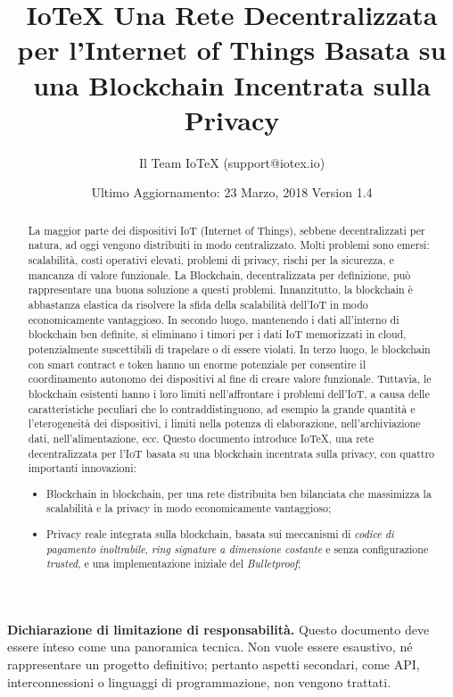 \documentclass[a4paper,12pt]{article}
\title{
	IoTeX
	\linebreak
	\Large Una Rete Decentralizzata per l'Internet of Things
	\linebreak
	\Large Basata su una Blockchain Incentrata sulla Privacy}
\author{Il Team IoTeX (support@iotex.io)}
\date{Ultimo Aggiornamento: 23 Marzo, 2018
	\linebreak Version 1.4
	}
\begin{document}
\maketitle

\vspace{200pt}


\textbf{Dichiarazione di limitazione di responsabilità.} Questo documento deve essere inteso come una panoramica tecnica. Non vuole essere esaustivo, né rappresentare un progetto definitivo; pertanto aspetti secondari, come API, interconnessioni o linguaggi di programmazione, non vengono trattati.

\pagebreak

\begin{abstract}
	La maggior parte dei dispositivi IoT (Internet of Things), sebbene decentralizzati per natura, ad oggi vengono distribuiti in modo centralizzato. Molti problemi sono emersi: scalabilità, costi operativi elevati, problemi di privacy, rischi per la sicurezza, e mancanza di valore funzionale. La Blockchain, decentralizzata per definizione, può rappresentare una buona soluzione a questi problemi. Innanzitutto, la blockchain è abbastanza elastica da risolvere la sfida della scalabilità dell'IoT in modo economicamente vantaggioso. In secondo luogo, mantenendo i dati all'interno di blockchain ben definite, si eliminano i timori per i dati IoT memorizzati in cloud, potenzialmente suscettibili di trapelare o di essere violati. In terzo luogo, le blockchain con smart contract e token hanno un enorme potenziale per consentire il coordinamento autonomo dei dispositivi al fine di creare valore funzionale. Tuttavia, le blockchain esistenti hanno i loro limiti nell'affrontare i problemi dell'IoT, a causa delle caratteristiche peculiari che lo contraddistinguono, ad esempio la grande quantità e l'eterogeneità dei dispositivi, i limiti nella potenza di elaborazione, nell'archiviazione dati, nell'alimentazione, ecc.
	Questo documento introduce IoTeX, una rete decentralizzata per l'IoT basata su una blockchain incentrata sulla privacy, con quattro importanti innovazioni:

	\begin{itemize}

		\item
		      Blockchain in blockchain, per una rete distribuita ben bilanciata che massimizza la scalabilità e la privacy in modo economicamente vantaggioso;

		\item
		      Privacy reale integrata sulla blockchain, basata sui meccanismi di \emph{codice di pagamento inoltrabile}, \emph{ring signature a dimensione costante} e senza configurazione \emph{trusted}, e una implementazione iniziale del \emph{Bulletproof};


\end{itemize}
\end{abstract}
\end{document}

